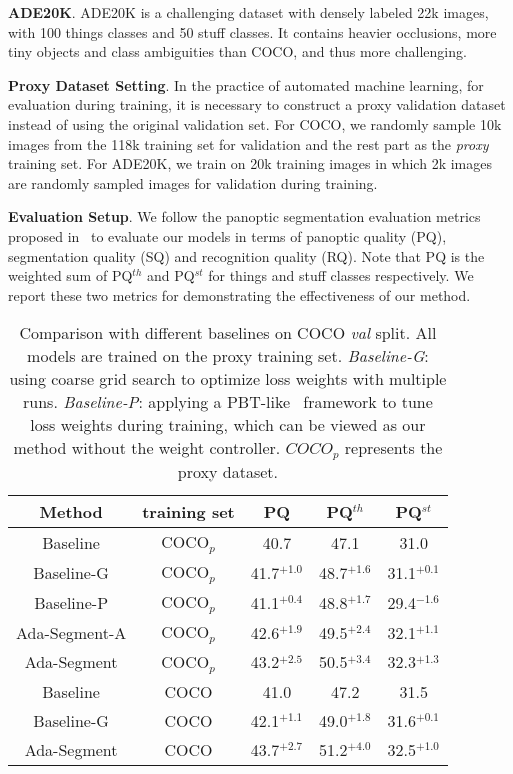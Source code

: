 \documentclass[letterpaper]{article} \usepackage{aaai21}  \usepackage{times}  \usepackage{helvet} \usepackage{courier}  \usepackage[hyphens]{url}  \usepackage{graphicx} \urlstyle{rm} \def\UrlFont{\rm}  \usepackage{natbib}  \usepackage{caption} \frenchspacing  \setlength{\pdfpagewidth}{8.5in}  \setlength{\pdfpageheight}{11in}
\begin{document}
 \noindent
 \textbf{ADE20K}. ADE20K is a challenging dataset with densely labeled 22k images, 
 with 100 things classes and 50 stuff classes. 
 It contains heavier occlusions, more tiny objects and class ambiguities than COCO,
  and thus more challenging.
 
 \noindent
 \textbf{Proxy Dataset Setting}. 
 In the practice of automated machine learning,
 for evaluation during training, it is necessary to construct a proxy validation
 dataset instead of using the original validation set. 
 For COCO, we randomly sample 10k images from the 118k training set 
 for validation and the rest part as the \textit{proxy} training set. 
 For ADE20K, we train on 20k training images in which 2k images are
  randomly sampled images for validation during training.


 \noindent
 \textbf{Evaluation Setup}.  We follow the panoptic segmentation evaluation
 metrics proposed in~\cite{panoptic_segmentation} to evaluate our
 models in terms of panoptic quality (PQ), segmentation quality (SQ)
 and recognition quality (RQ). Note that PQ is the weighted sum of PQ$^{th}$ and PQ$^{st}$
 for things and stuff classes respectively. We report these two metrics for demonstrating 
 the effectiveness of our method.
 

 \begin{table}[t]
  \begin{centering}
  \tabcolsep 0.03in\renewcommand{\arraystretch}{1.2}{\footnotesize{}}\begin{tabular}{c|c|ccc}
  \hline 
  Method & training set & PQ & PQ$^{th}$ & PQ$^{st}$ \tabularnewline
  \hline 
  Baseline & COCO$_p$ & 40.7 & 47.1 & 31.0 \tabularnewline
Baseline-G & COCO$_p$ & 41.7$^{+1.0}$ & 48.7$^{+1.6}$ & 31.1$^{+0.1}$ \tabularnewline
  Baseline-P & COCO$_p$ & 41.1$^{+0.4}$ & 48.8$^{+1.7}$ & 29.4$^{-1.6}$ \tabularnewline
  \hline 
  Ada-Segment-A & COCO$_p$ & 42.6$^{+1.9}$ & 49.5$^{+2.4}$ & 32.1$^{+1.1}$ \tabularnewline
  Ada-Segment & COCO$_p$ & 43.2$^{+2.5}$ & 50.5$^{+3.4}$ & 32.3$^{+1.3}$ \tabularnewline
  \hline 
  \hline 
  Baseline & COCO & 41.0 & 47.2 & 31.5 \tabularnewline
  Baseline-G & COCO & 42.1$^{+1.1}$ & 49.0$^{+1.8}$ & 31.6$^{+0.1}$ \tabularnewline
\hline 
Ada-Segment & COCO & 43.7$^{+2.7}$ & 51.2$^{+4.0}$ & 32.5$^{+1.0}$ \tabularnewline
\hline 
  \end{tabular}{\footnotesize\par}
  \par\end{centering}
\caption{\label{tab:Ablation-Studies-on-coco}Comparison with different baselines on COCO \textit{val} split.
  All models are trained on the proxy training set.   
  \textit{Baseline-G}: using coarse grid search to optimize loss weights with multiple runs.
  \textit{Baseline-P}: applying a PBT-like~\cite{jaderberg2017pbt} framework to tune 
  loss weights during training, which can be viewed as our method without the weight controller. $COCO_p$ represents the proxy dataset.}
\end{table}  
\end{document}
